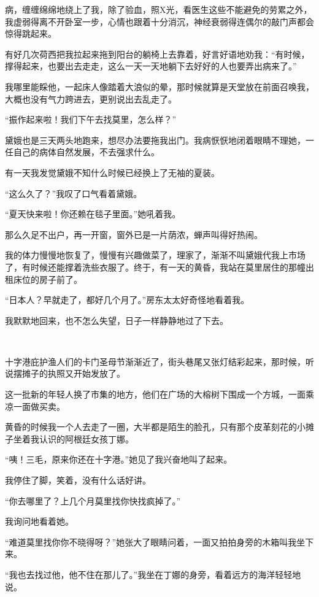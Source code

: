 \par 病，缠缠绵绵地绕上了我，除了验血，照X光，看医生这些不能避免的劳累之外，我虚弱得离不开卧室一步，心情也跟着十分消沉，神经衰弱得连偶尔的敲门声都会惊得跳起来。
\par 有好几次荷西把我拉起来拖到阳台的躺椅上去靠着，好言好语地劝我：“有时候，撑得起来，也要出去走走，这么一天一天地躺下去好好的人也要弄出病来了。”
\par 我哪里能睬他，一起床人像踏着大浪似的晕，那时候就算是天堂放在前面召唤我，大概也没有气力跨进去，更别说出去乱走了。
\par “振作起来啦！我们下午去找莫里，怎么样？”
\par 黛娥也是三天两头地跑来，想尽办法要拖我出门。我病恹恹地闭着眼睛不理她，一任自己的病体自然发展，不去强求什么。
\par 有一天我发觉黛娥不知什么时候已经换上了无袖的夏装。
\par “这么久了？”我叹了口气看着黛娥。
\par “夏天快来啦！你还赖在毯子里面。”她吼着我。
\par 那么久足不出户，再一开窗，窗外已是一片荫浓，蝉声叫得好热闹。
\par 我的体力慢慢地恢复了，慢慢有兴趣做菜了，理家了，渐渐不叫黛娥代我上市场了，有时候还能撑着洗些衣服了。终于，有一天的黄昏，我站在莫里居住的那幢出租床位的房子前了。
\par “日本人？早就走了，都好几个月了。”房东太太好奇怪地看着我。
\par 我默默地回来，也不怎么失望，日子一样静静地过了下去。
\par  
\par 十字港庇护渔人们的卡门圣母节渐渐近了，街头巷尾又张灯结彩起来，那时候，听说摆摊子的执照又开始发放了。
\par 这一批新的年轻人换了市集的地方，他们在广场的大榕树下围成一个方城，一面乘凉一面做买卖。
\par 黄昏的时候我一个人去走了一圈，大半都是陌生的脸孔，只有那个皮革刻花的小摊子坐着我认识的阿根廷女孩丁娜。
\par “咦！三毛，原来你还在十字港。”她见了我兴奋地叫了起来。
\par 我停住了脚，笑着，没有什么话好讲。
\par “你去哪里了？上几个月莫里找你快找疯掉了。”
\par 我询问地看着她。
\par “难道莫里找你你不晓得呀？”她张大了眼睛问着，一面又拍拍身旁的木箱叫我坐下来。
\par “我也去找过他，他不住在那儿了。”我坐在丁娜的身旁，看着远方的海洋轻轻地说。
